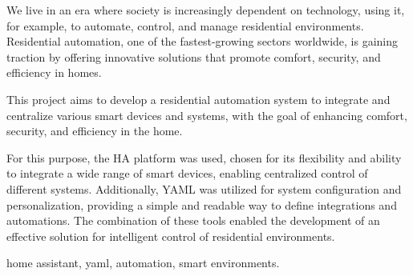 
We live in an era where society is increasingly dependent on technology, using it, for example, to automate, control, and manage residential environments. Residential automation, one of the fastest-growing sectors worldwide, is gaining traction by offering innovative solutions that promote comfort, security, and efficiency in homes.

This project aims to develop a residential automation system to integrate and centralize various smart devices and systems, with the goal of enhancing comfort, security, and efficiency in the home.

For this purpose, the \gls{HA} platform was used, chosen for its flexibility and ability to integrate a wide range of smart devices, enabling centralized control of different systems. Additionally, \gls{YAML} was utilized for system configuration and personalization, providing a simple and readable way to define integrations and automations. The combination of these tools enabled the development of an effective solution for intelligent control of residential environments.


\mbox{}\linebreak
{} home assistant, yaml, automation, smart environments.


